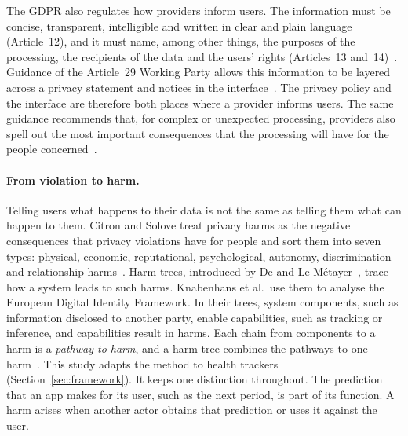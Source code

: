 The GDPR also regulates how providers inform users. The information must be concise, transparent, intelligible and written in clear and
plain language (Article~12), and it must name, among other things, the purposes
of the processing, the recipients of the data and the users' rights
(Articles~13 and~14)~\parencite{gdpr2016}. Guidance of the Article~29 Working
Party allows this information to be layered across a privacy statement and
notices in the interface~\parencite[paras.~35, 39]{wp292018transparency}. The
privacy policy and the interface are therefore both places where a provider
informs users. The same guidance recommends that, for complex or unexpected
processing, providers also spell out the most important consequences that the
processing will have for the people
concerned~\parencite[para.~10]{wp292018transparency}.

\paragraph{From violation to harm.} Telling users what happens to their data is
not the same as telling them what can happen to them. Citron and Solove treat
privacy harms as the negative consequences that privacy violations have for
people and sort them into seven types: physical, economic, reputational,
psychological, autonomy, discrimination and relationship
harms~\parencite{citron2021harms}. Harm trees, introduced by De and Le
M\'etayer~\parencite{de2016privacy}, trace how a system leads to such harms.
Knabenhans et al.\ use them to analyse the European Digital Identity Framework.
In their trees, system components, such as information disclosed to another
party, enable capabilities, such as tracking or inference, and capabilities
result in harms. Each chain from components to a harm is a \emph{pathway to
harm}, and a harm tree combines the pathways to one
harm~\parencite[\S4.1]{knabenhans2026harms}. This study adapts the method to
health trackers (Section~\ref{sec:framework}). It keeps one distinction
throughout. The prediction that an app makes for its user, such as the next
period, is part of its function. A harm arises when another actor obtains that
prediction or uses it against the user.

